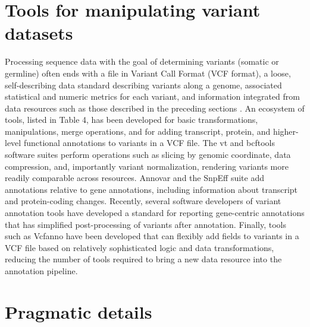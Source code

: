 \documentclass{article}
\begin{document}
\section{Tools for manipulating variant datasets}

 


Processing sequence data with the goal of determining variants
(somatic or germline) often ends with a file in Variant Call Format
(VCF format), a loose, self-describing data standard describing
variants along a genome, associated statistical and numeric metrics
for each variant, and information integrated from data resources such
as those described in the preceding sections \cite{Danecek2011-du}. An
ecosystem of tools, listed in Table 4, has been developed for basic
transformations, manipulations, merge operations, and for adding
transcript, protein, and higher-level functional annotations to
variants in a VCF file. The vt and bcftools software suites perform
operations such as slicing by genomic coordinate, data compression,
and, importantly variant normalization, rendering variants more
readily comparable across resources. Annovar
\cite{Yang2015-bg,Wang2010-bt} and the SnpEff suite
\cite{Cingolani2012-pt} add annotations relative to gene annotations,
including information about transcript and protein-coding
changes. Recently, several software developers of variant annotation
tools have developed a standard for reporting gene-centric annotations
that has simplified post-processing of variants after
annotation. Finally, tools such as Vcfanno \cite{Pedersen2016-pu} have
been developed that can flexibly add fields to variants in a VCF file
based on relatively sophisticated logic and data transformations,
reducing the number of tools required to bring a new data resource
into the annotation pipeline.

\section{Pragmatic details}
\end{document}
